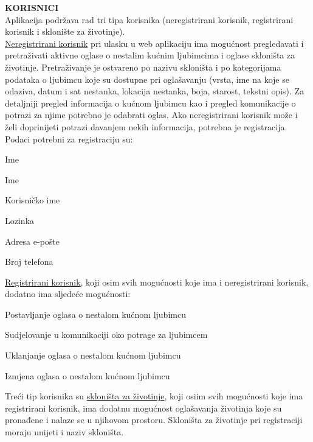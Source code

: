 		\textbf{KORISNICI}\\
		Aplikacija podržava rad tri tipa korisnika (neregistrirani korisnik, registrirani korisnik i sklonište za životinje).\\
		\underline{Neregistrirani korisnik} pri ulasku u web aplikaciju ima mogućnost pregledavati i pretraživati aktivne oglase o nestalim kućnim ljubimcima i oglase skloništa za životinje. Pretraživanje je ostvareno po nazivu skloništa i po kategorijama podataka o ljubimcu koje su dostupne pri oglašavanju (vrsta, ime na koje se odaziva, datum i sat nestanka, lokacija nestanka, boja, starost, tekstni opis). Za detaljniji pregled informacija o kućnom ljubimcu kao i pregled komunikacije o potrazi za njime potrebno je odabrati oglas. Ako neregistrirani korisnik može i želi doprinijeti potrazi davanjem nekih informacija, potrebna je registracija.
		Podaci potrebni za registraciju su:
		\begin{packed_item}
			\item Ime
			\item Ime
			\item Korisničko ime
			\item Lozinka
			\item Adresa e-pošte
			\item Broj telefona
	    \end{packed_item}
	    \underline{Registrirani korisnik}, koji osim svih mogućnosti koje ima i neregistrirani korisnik, dodatno ima sljedeće mogućnosti:
		\begin{packed_item}
			\item Postavljanje oglasa o nestalom kućnom ljubimcu 
			\item Sudjelovanje u komunikaciji oko potrage za ljubimcem
			\item Uklanjanje oglasa o nestalom kućnom ljubimcu
			\item Izmjena oglasa o nestalom kućnom ljubimcu
		\end{packed_item}
		Treći tip korisnika su \underline{skloništa za životinje}, koji osiim svih mogućnosti koje ima registrirani korisnik, ima dodatnu mogućnost oglašavanja životinja koje su pronađene i nalaze se u njihovom prostoru. Skloništa za životinje pri registraciji moraju unijeti i naziv skloništa.\\
		
